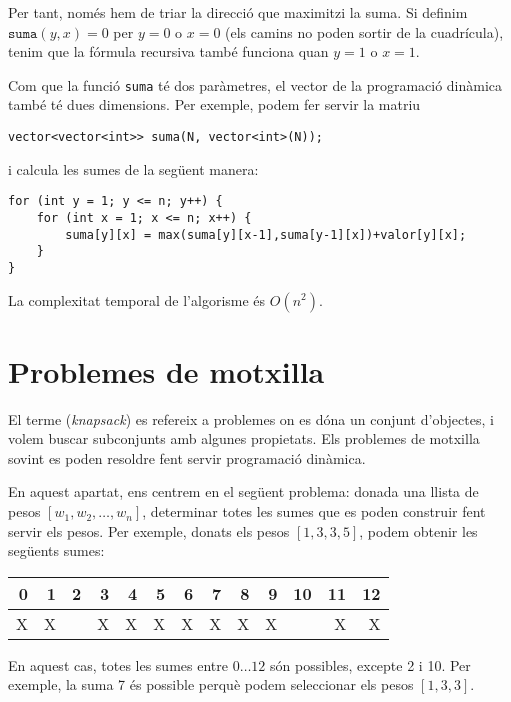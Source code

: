 Per tant, només hem de triar la direcció que maximitzi la suma.
Si definim $\texttt{suma}(y,x)=0$
per $y=0$ o $x=0$ (els camins no poden sortir de la cuadrícula),
tenim que la fórmula recursiva també funciona quan $y=1$ o $x=1$.

Com que la funció \texttt{suma} té dos paràmetres,
el vector de la programació dinàmica també té dues dimensions.
Per exemple, podem fer servir la matriu
\begin{lstlisting}
vector<vector<int>> suma(N, vector<int>(N));
\end{lstlisting}
i calcula les sumes de la següent manera:
\begin{lstlisting}
for (int y = 1; y <= n; y++) {
    for (int x = 1; x <= n; x++) {
        suma[y][x] = max(suma[y][x-1],suma[y-1][x])+valor[y][x];
    }
}
\end{lstlisting}
La complexitat temporal de l'algorisme és $O(n^2)$.

\section{Problemes de motxilla} \label{knapsack-problems}


El terme  (\emph{knapsack}) es refereix a problemes on
es dóna un conjunt d'objectes, i volem
buscar subconjunts amb algunes propietats.
Els problemes de motxilla sovint es poden resoldre
fent servir programació dinàmica.

En aquest apartat, ens centrem en el següent
problema: donada una llista de pesos
$[w_1,w_2,\ldots,w_n]$,
determinar totes les 
sumes que es poden construir fent servir els pesos.
Per exemple, donats els pesos
$[1,3,3,5]$, podem obtenir les següents sumes:

\begin{center}
\begin{tabular}{rrrrrrrrrrrrr}
 0 & 1 & 2 & 3 & 4 & 5 & 6 & 7 & 8 & 9 & 10 & 11 & 12 \\
\hline
 X & X & & X & X & X & X & X & X & X & & X & X \\
\end{tabular}
\end{center}

En aquest cas, totes les sumes entre $0 \ldots 12$
són possibles, excepte 2 i 10.
Per exemple, la suma 7 és possible perquè
podem seleccionar els pesos $[1,3,3]$.

